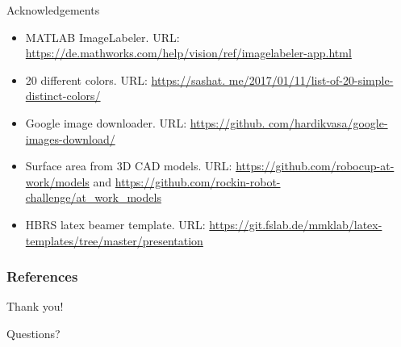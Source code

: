 \documentclass{beamer}
\begin{document}
\begin{frame}{Acknowledgements}
		\begin{itemize}
			\item MATLAB ImageLabeler. URL: \url{https://de.mathworks.com/help/vision/ref/imagelabeler-app.html}
			\item 20 different colors. URL: \url{ https://sashat.
me/2017/01/11/list-of-20-simple-distinct-colors/}
			\item Google image downloader. URL: \url{ https://github.
com/hardikvasa/google-images-download/}
			\item Surface area from 3D CAD models. URL: \url{ https://github.com/robocup-at-work/models} and \url{https://github.com/rockin-robot-challenge/at_work_models}
			\item HBRS latex beamer template. URL: \url{https://git.fslab.de/mmklab/latex-templates/tree/master/presentation}
		\end{itemize}
\end{frame}

\begin{frame}
  \frametitle{References}
  \printbibliography[title={References}]	
\end{frame}

\begin{frame}{Thank you!}
	\begin{center}
		Questions?
	\end{center}
\end{frame}
\end{document}
